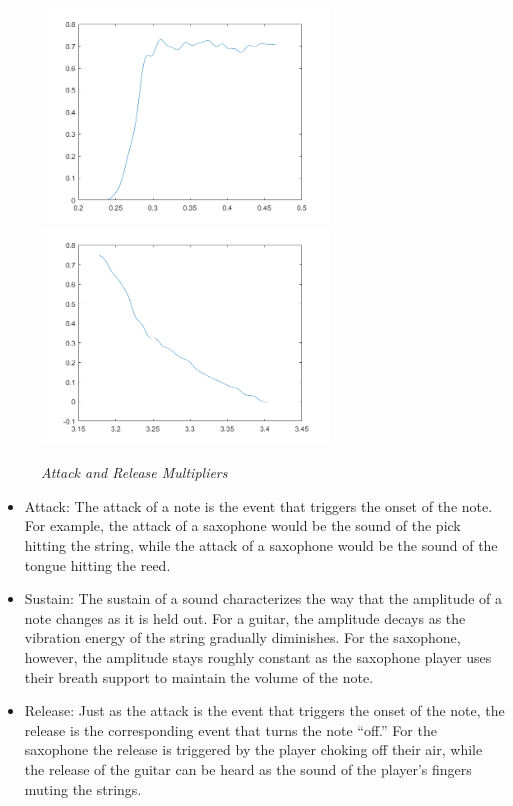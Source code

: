 \documentclass[twoside,a4paper]{article}
\begin{document}

\begin{figure}[ht]
  \center
  \includegraphics[width=3in]{Pictures/Attack_Env.png}
  \includegraphics[width=3in]{Pictures/Release_Env.png}
  \caption{\label{AttRel} {\it Attack and Release Multipliers}}
  \end{figure}

\begin{itemize}
\item Attack: The attack of a note is the event that triggers the onset
of the note. For example, the attack of a saxophone would be the sound of the pick
hitting the string, while the attack of a saxophone would be the sound of the tongue
hitting the reed.

\item Sustain: The sustain of a sound characterizes the way that the amplitude of
a note changes as it is held out. For a guitar, the amplitude decays as the vibration
energy of the string gradually diminishes. For the saxophone, however, the amplitude
stays roughly constant as the saxophone player uses their breath
support to maintain the volume of the note.

\item Release: Just as the attack is the event that triggers the onset of
the note, the release is the corresponding event that turns the note ``off.''
For the saxophone the release is triggered by the player choking off their air,
while the release of the guitar can be heard as the sound of the player's fingers
muting the strings.
\end{itemize}
\end{document}
